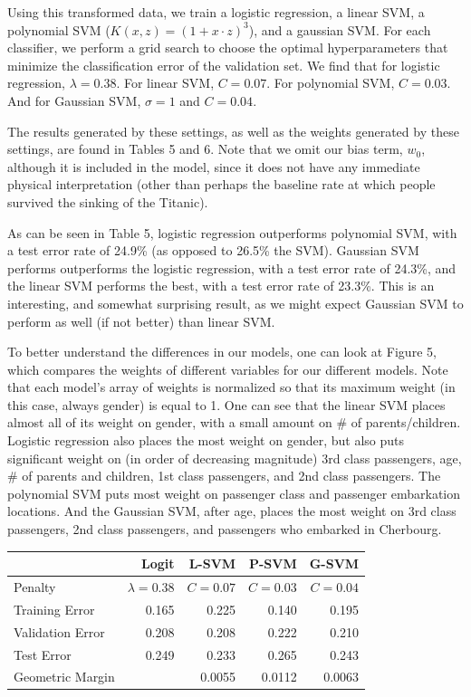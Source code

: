 \documentclass[10pt]{article}
\begin{document}
Using this transformed data, we train a logistic regression, a linear SVM, a polynomial SVM ($K(x,z) = (1+x\cdot z)^3$), and a gaussian SVM. For each classifier, we perform a grid search to choose the optimal hyperparameters that minimize the classification error of the validation set. We find that for logistic regression,  $\lambda = 0.38$. For linear SVM, $C=0.07$. For polynomial SVM, $C=0.03$. And for Gaussian SVM, $\sigma = 1$ and $C=0.04$.

The results generated by these settings, as well as the weights generated by these settings, are found in Tables 5 and 6. Note that we omit our bias term, $w_0$, although it is included in the model, since it does not have any immediate physical interpretation (other than perhaps the baseline rate at which people survived the sinking of the Titanic). 

As can be seen in Table 5, logistic regression outperforms polynomial SVM, with a test error rate of 24.9\% (as opposed to 26.5\% the SVM). Gaussian SVM performs outperforms the logistic regression, with a test error rate of 24.3\%, and the linear SVM performs the best, with a test error rate of 23.3\%. This is an interesting, and somewhat surprising result, as we might expect Gaussian SVM to perform as well (if not better) than linear SVM.

To better understand the differences in our models, one can look at Figure 5, which compares the weights of different variables for our different models. Note that each model's array of weights is normalized so that its maximum weight (in this case, always gender) is equal to 1. One can see that the linear SVM places almost all of its weight on gender, with a small amount on \# of parents/children. Logistic regression also places the most weight on gender, but also puts significant weight on (in order of decreasing magnitude) 3rd class passengers, age, \# of parents and children, 1st class passengers, and 2nd class passengers. The polynomial SVM puts most weight on passenger class and passenger embarkation locations. And the Gaussian SVM, after age, places the most weight on 3rd class passengers, 2nd class passengers, and passengers who embarked in Cherbourg.

\begin{table}[ht]
\centering
{}
\begin{tabular}{lrrrr}
\toprule
{} & Logit & L-SVM & P-SVM & G-SVM \\
\midrule
Penalty & $\lambda = 0.38$ & $C = 0.07$ & $C = 0.03$ & $C = 0.04$\\
\midrule
Training Error    &  0.165 &  0.225 & 0.140 &  0.195 \\
Validation Error  &  0.208 &  0.208 & 0.222 &  0.210 \\
Test Error        &  0.249 &  0.233 & 0.265 &  0.243 \\
Geometric Margin  & {}     &  0.0055& 0.0112& 0.0063 \\
\bottomrule
\end{tabular}	
\end{table}
\end{document}
